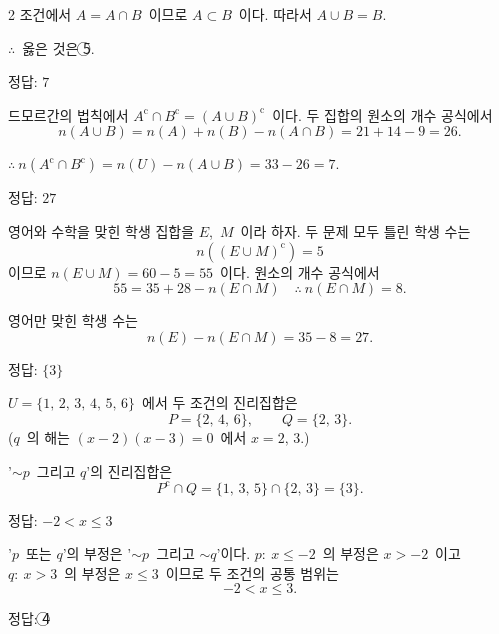 \documentclass[10pt,fleqn]{article}
\begin{document}
\begin{multicols*}{2}
조건에서 $A=A\cap B$\ 이므로 $A\subset B$\ 이다. 따라서 $A\cup B=B$.

\vspace{2mm}
$\therefore$\ 옳은 것은 \textcircled{\scriptsize 5}.

\begin{dmanswerbox}
정답: $7$
\end{dmanswerbox}

드모르간의 법칙에서 $A^{\mathrm{c}}\cap B^{\mathrm{c}}=(A\cup B)^{\mathrm{c}}$\ 이다. 두 집합의 원소의 개수 공식에서
\[ n(A\cup B)=n(A)+n(B)-n(A\cap B)=21+14-9=26. \]

$\therefore\ n(A^{\mathrm{c}}\cap B^{\mathrm{c}})=n(U)-n(A\cup B)=33-26=7$.

\begin{dmanswerbox}
정답: $27$
\end{dmanswerbox}

영어와 수학을 맞힌 학생 집합을 $E$,\ $M$\ 이라 하자. 두 문제 모두 틀린 학생 수는
\[ n((E\cup M)^{\mathrm{c}})=5 \]
이므로 $n(E\cup M)=60-5=55$\ 이다. 원소의 개수 공식에서
\[ 55=35+28-n(E\cap M)\quad\therefore\ n(E\cap M)=8. \]

영어만 맞힌 학생 수는
\[ n(E)-n(E\cap M)=35-8=27. \]

\begin{dmanswerbox}
정답: $\{3\}$
\end{dmanswerbox}

$U=\{1,\,2,\,3,\,4,\,5,\,6\}$\ 에서 두 조건의 진리집합은
\[ P=\{2,\,4,\,6\},\qquad Q=\{2,\,3\}. \]
($q$\ 의 해는 $(x-2)(x-3)=0$\ 에서 $x=2,\,3$.)

'$\sim p$\ 그리고 $q$'의 진리집합은
\[ P^{\mathrm{c}}\cap Q=\{1,\,3,\,5\}\cap\{2,\,3\}=\{3\}. \]

\begin{dmanswerbox}
정답: $-2<x\le 3$
\end{dmanswerbox}

'$p$\ 또는 $q$'의 부정은 '$\sim p$\ 그리고 $\sim q$'이다. $p:\ x\le -2$\ 의 부정은 $x>-2$\ 이고 $q:\ x>3$\ 의 부정은 $x\le 3$\ 이므로 두 조건의 공통 범위는
\[ -2<x\le 3. \]

\begin{dmanswerbox}
정답: \textcircled{\scriptsize 4}
\end{dmanswerbox}


\end{multicols*}
\end{document}
